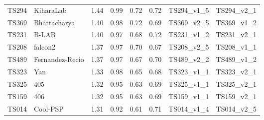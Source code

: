 \begin{table}[ht]
{\begin{tabular}{llllllll}
TS294 & KiharaLab & 1.44 & 0.99 & 0.72 & 0.72 & TS294\_v1\_5 & TS294\_v2\_1 \\ 
TS369 & Bhattacharya & 1.40 & 0.98 & 0.72 & 0.69 & TS369\_v2\_5 & TS369\_v1\_2 \\ 
TS231 & B-LAB & 1.40 & 0.97 & 0.68 & 0.72 & TS231\_v1\_2 & TS231\_v2\_1 \\ 
TS208 & falcon2 & 1.37 & 0.97 & 0.70 & 0.67 & TS208\_v2\_5 & TS208\_v1\_1 \\ 
TS489 & Fernandez-Recio & 1.37 & 0.97 & 0.67 & 0.70 & TS489\_v2\_2 & TS489\_v1\_2 \\ 
TS323 & Yan & 1.33 & 0.98 & 0.65 & 0.68 & TS323\_v1\_1 & TS323\_v2\_1 \\ 
TS325 & 405 & 1.32 & 0.95 & 0.63 & 0.69 & TS325\_v1\_1 & TS325\_v2\_1 \\ 
TS159 & 406 & 1.32 & 0.95 & 0.63 & 0.69 & TS159\_v1\_1 & TS159\_v2\_1 \\ 
TS014 & Cool-PSP & 1.31 & 0.92 & 0.61 & 0.71 & TS014\_v1\_4 & TS014\_v2\_5 \\ 
\bottomrule
\end{tabular}%
}
\end{table}
